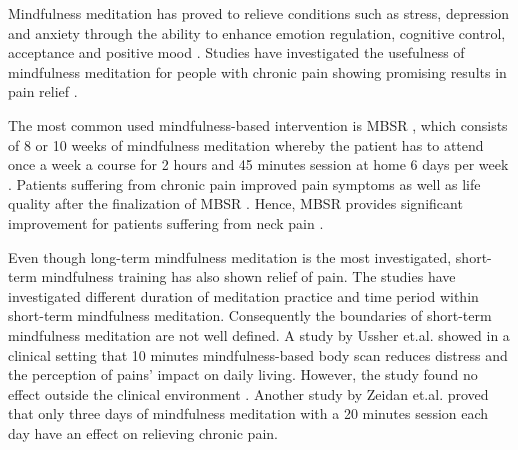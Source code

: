 Mindfulness meditation has proved to relieve conditions such as stress, depression and anxiety through the ability to enhance emotion regulation, cognitive control, acceptance and positive mood \cite{Zeidan2016, Zeidan2012}. Studies have investigated the usefulness of mindfulness meditation for people with chronic pain showing promising results in pain relief \cite{Kabat1982,Rosenzweig2010}.


The most common used mindfulness-based intervention is MBSR \cite{Cramer2012}, which consists of 8 or 10 weeks of mindfulness meditation whereby the patient has to attend once a week a course for 2 hours and 45 minutes session at home 6 days per week \cite{Kabat1982, Chiesa2010}. Patients suffering from chronic pain improved pain symptoms as well as life quality after the finalization of MBSR \cite{Zeidan2012}.
%
Hence, MBSR provides significant improvement for patients suffering from neck pain \cite{Rosenzweig2010}.

Even though long-term mindfulness meditation is the most investigated, short-term mindfulness training has also shown relief of pain. The studies have investigated different duration of meditation practice and time period within short-term mindfulness meditation. Consequently the boundaries of short-term mindfulness meditation are not well defined. A study by Ussher et.al. \cite{Ussher2012} showed in a clinical setting that 10 minutes mindfulness-based body scan reduces distress and the perception of pains’ impact on daily living. However, the study found no effect outside the clinical environment \cite{Ussher2012}. Another study by Zeidan et.al. \cite{Zeidan2012} proved that only three days of mindfulness meditation with a 20 minutes session each day have an effect on relieving chronic pain. 

